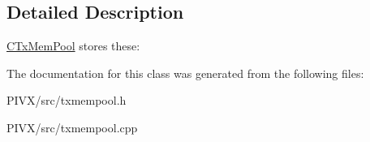 \subsection{Detailed Description}
\mbox{\hyperlink{class_c_tx_mem_pool}{C\+Tx\+Mem\+Pool}} stores these\+: 

The documentation for this class was generated from the following files\+:\begin{DoxyCompactItemize}
\item 
P\+I\+V\+X/src/txmempool.\+h\item 
P\+I\+V\+X/src/txmempool.\+cpp\end{DoxyCompactItemize}
